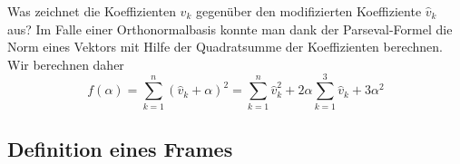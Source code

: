 Was zeichnet die Koeffizienten $\hat{v}_k$ gegenüber den modifizierten
Koeffiziente $\hat{v}_k$ aus?
Im Falle einer Orthonormalbasis konnte man dank der Parseval-Formel
die Norm eines Vektors mit Hilfe der Quadratsumme der Koeffizienten
berechnen.
Wir berechnen daher
\[
f(\alpha)
=
\sum_{k=1}^n (\hat{v}_k+\alpha)^2
=
\sum_{k=1}^n \hat{v}_k^2 + 2\alpha \sum_{k=1}^3 \hat{v}_k + 3\alpha^2
\]

\subsection{Definition eines Frames}





